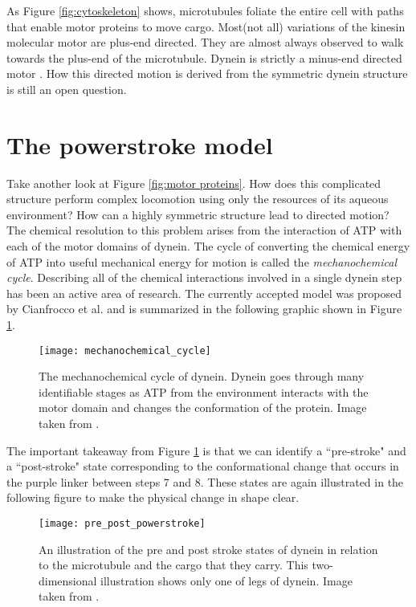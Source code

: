As Figure \ref{fig:cytoskeleton} shows, microtubules foliate the entire cell with paths that enable motor proteins to move cargo. Most(not all) variations of the kinesin molecular motor are plus-end directed. They are almost always observed to walk towards the plus-end of the microtubule. Dynein is strictly a minus-end directed motor \cite{alberts_molecular_2002}. How this directed motion is derived from the symmetric dynein structure is still an open question.\\



\section{The powerstroke model} 
Take another look at Figure \ref{fig:motor proteins}. How does this complicated structure perform complex locomotion using only the resources of its aqueous environment? How can a highly symmetric structure lead to directed motion? The chemical resolution to this problem arises from the interaction of ATP with each of the motor domains of dynein. The cycle of converting the chemical energy of  ATP into useful mechanical energy for motion is called the \textit{mechanochemical cycle}\cite{cianfrocco_mechanism_2015}. Describing all of the chemical interactions involved in a single dynein step has been an active area of research. The currently accepted model was proposed by Cianfrocco et al. and is summarized in the following graphic shown in Figure \ref{fig:mechanochemical_cycle}. 

\begin{figure}[!hbt]
	\centering
	\texttt{[image: mechanochemical\_cycle]}
	\caption{The mechanochemical cycle of dynein. Dynein goes through many identifiable stages as ATP from the environment interacts with the motor domain and changes the conformation of the protein. Image taken from \cite{cianfrocco_mechanism_2015}.}
	\label{fig:mechanochemical_cycle}
\end{figure}

The important takeaway from Figure \ref{fig:mechanochemical_cycle} is that we can identify a ``pre-stroke" and a ``post-stroke" state corresponding to the conformational change that occurs in the purple linker between steps 7 and 8. These states are again illustrated in the following figure to make the physical change in shape clear. 

\begin{figure}[!hbt]
	\centering
	\texttt{[image: pre\_post\_powerstroke]}
	\caption{An illustration of the pre and post stroke states of dynein in relation to the microtubule and the cargo that they carry. This two-dimensional illustration shows only one of legs of dynein. Image taken from \cite{dynein_powerstroke}.}
\end{figure}

